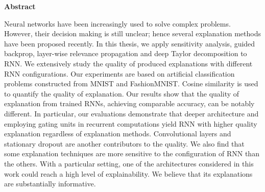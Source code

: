 \thispagestyle{empty}
\vspace*{1.0cm}

\begin{center}
    \textbf{Abstract}
\end{center}

\vspace*{0.5cm}

\noindent

Neural networks have been increasingly used to solve complex problems. However, their decision making is still unclear; hence several explanation methods have been proposed recently. In this thesis, we apply sensitivity analysis, guided backprop, layer-wise relevance propagation and deep Taylor decomposition to RNN. We extensively study the quality of produced explanations with different RNN configurations. Our experiments are based on artificial classification problems constructed from MNIST and FashionMNIST. Cosine similarity is used to quantify the quality of explanation. Our results show that the quality of explanation from trained RNNs, achieving comparable accuracy, can be notably different. In particular, our evaluations demonstrate that deeper architecture and employing gating units in recurrent computations yield RNN with higher quality explanation regardless of explanation methods.  Convolutional layers and stationary dropout are another contributors to the quality. We also find that some explanation techniques are more sensitive to the configuration of RNN than the others. With a particular setting, one of the architectures considered in this work could reach a high level of explainability. We believe that its explanations are substantially informative.


%
%
%
%

